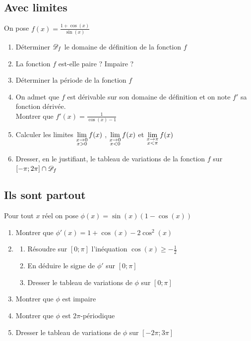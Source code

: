 \documentclass[oneside,12pt]{book}          %
\begin{document}
\subsection{Avec limites}
On pose $f(x)=\frac{1+\cos(x)}{\sin(x)}$
\begin{enumerate}
    \item Déterminer ${\mathscr{D}}_f$ le domaine de définition de la fonction $f$
    \item La fonction $f$ est-elle paire ? Impaire ?
    \item Déterminer la période de la fonction $f$
    \item On admet que $f$ est dérivable sur son domaine de définition et on note $f'$ sa fonction dérivée.\\
    Montrer que $f'(x)=\frac{1}{\cos(x)-1}$
    \item Calculer les limites ${\lim\limits_{\substack{x\to0\\x>0}}}\,f(x)$ , ${\lim\limits_{\substack{x\to0\\x<0}}}\,f(x)$ et ${\lim\limits_{\substack{x\to\pi\\x<\pi}}}\,f(x)$
    \item Dresser, en le justifiant, le tableau de variations de la fonction $f$ sur $[-\pi;2\pi]\cap{\mathscr{D}}_f$
\end{enumerate}



\subsection{Ils sont partout}
Pour tout $x$ réel on pose $\phi(x)=\sin(x)(1-\cos(x))$
\begin{enumerate}
    \item Montrer que $\phi'(x)=1+\cos(x)-2\cos^2(x)$
    \item \begin{enumerate}
        \item Résoudre sur $[0;\pi]$ l'inéquation $\cos(x)\geq-\frac{1}{2}$
        \item En déduire le signe de $\phi'$ sur $[0;\pi]$
        \item Dresser le tableau de variations de $\phi$ sur $[0;\pi]$
    \end{enumerate}
    \item Montrer que $\phi$ est impaire
    \item Montrer que $\phi$ est $2\pi$-périodique
    \item Dresser le tableau de variations de $\phi$ sur $[-2\pi;3\pi]$
\end{enumerate}
\end{document}
